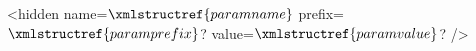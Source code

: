 <hidden name=$\xmlstructref{paramname}$
  prefix=$\xmlstructref{paramprefix}$?
  value=$\xmlstructref{paramvalue}$? />
